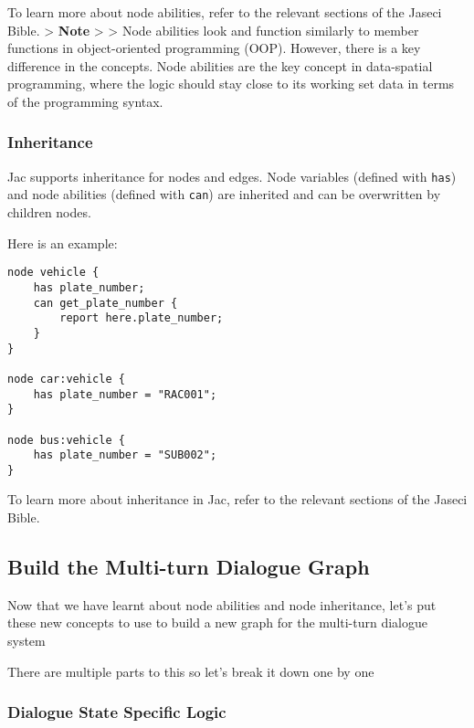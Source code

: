 To learn more about node abilities, refer to the relevant sections of
the Jaseci Bible. \textgreater{} \textbf{Note} \textgreater{}
\textgreater{} Node abilities look and function similarly to member
functions in object-oriented programming (OOP). However, there is a key
difference in the concepts. Node abilities are the key concept in
data-spatial programming, where the logic should stay close to its
working set data in terms of the programming syntax.

\hypertarget{inheritance}{%
\subsubsection{Inheritance}\label{inheritance}}

Jac supports inheritance for nodes and edges. Node variables (defined
with \passthrough{\lstinline!has!}) and node abilities (defined with
\passthrough{\lstinline!can!}) are inherited and can be overwritten by
children nodes.

Here is an example:

\begin{lstlisting}
node vehicle {
    has plate_number;
    can get_plate_number {
        report here.plate_number;
    }
}

node car:vehicle {
    has plate_number = "RAC001";
}

node bus:vehicle {
    has plate_number = "SUB002";
}
\end{lstlisting}

To learn more about inheritance in Jac, refer to the relevant sections
of the Jaseci Bible.

\hypertarget{build-the-multi-turn-dialogue-graph}{%
\subsection{Build the Multi-turn Dialogue
Graph}\label{build-the-multi-turn-dialogue-graph}}

Now that we have learnt about node abilities and node inheritance, let's
put these new concepts to use to build a new graph for the multi-turn
dialogue system

There are multiple parts to this so let's break it down one by one

\hypertarget{dialogue-state-specific-logic}{%
\subsubsection{Dialogue State Specific
Logic}\label{dialogue-state-specific-logic}}

